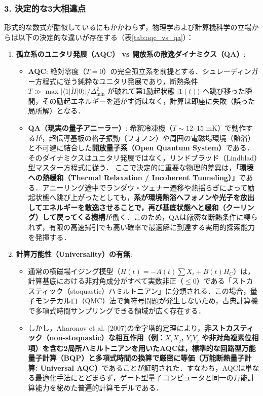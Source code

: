 \documentclass[11pt,a4paper,oneside,openany]{ltjsbook}
\theoremstyle{definition}
\theoremstyle{plain}
\theoremstyle{remark}
\newcommand{\ket}[1]{|#1\rangle}
\newcommand{\mel}[3]{\langle#1|#2|#3\rangle}
\begin{document}
\subsubsection*{3. 決定的な3大相違点}
形式的な数式が酷似しているにもかかわらず，物理学および計算機科学の立場からは以下の決定的な違いが存在する（表\ref{tab:aqc_vs_qa}）：

\begin{enumerate}
    \item \textbf{孤立系のユニタリ発展（AQC） vs 開放系の散逸ダイナミクス（QA）}:
    \begin{itemize}
        \item \textbf{AQC}: 絶対零度（$T=0$）の完全孤立系を前提とする．シュレーディンガー方程式に従う純粋なユニタリ発展であり，断熱条件 $T \gg \max |\mel{1}{\dot{H}}{0}| / \Delta_{\min}^2$ が破れて第1励起状態 $\ket{1(t)}$ へ跳び移った瞬間，その励起エネルギーを逃がす術はなく，計算は即座に失敗（誤った局所解）となる．
        \item \textbf{QA（現実の量子アニーラー）}: 希釈冷凍機（$T \sim 12\text{--}15\text{ mK}$）で動作するが，超伝導基板の格子振動（フォノン）や周囲の電磁場環境（熱浴）と不可避に結合した\textbf{開放量子系（Open Quantum System）}である．そのダイナミクスはユニタリ発展ではなく，リンドブラッド（Lindblad）型マスター方程式に従う．
        ここで決定的に重要な物理的差異は，\textbf{「環境への熱緩和（Thermal Relaxation / Incoherent Tunneling）」}である\cite{albash2018adiabatic}．アニーリング途中でランダウ・ツェナー遷移や熱揺らぎによって励起状態へ跳び上がったとしても，\textbf{系が環境熱浴へフォノンや光子を放出してエネルギーを散逸させることで，再び基底状態へと緩和（クーリング）して戻ってくる機構}が働く．このため，QAは厳密な断熱条件に縛られず，有限の高速掃引でも高い確率で最適解に到達する実用的探索能力を発揮する．
    \end{itemize}

    \item \textbf{計算万能性（Universality）の有無}:
    \begin{itemize}
        \item 通常の横磁場イジング模型（$H(t) = -A(t)\sum X_i + B(t)H_C$）は，計算基底における非対角成分がすべて実数非正（$\le 0$）である「ストカスティック（stoquastic）ハミルトニアン」に分類される．この場合，量子モンテカルロ（QMC）法で負符号問題が発生しないため，古典計算機で多項式時間サンプリングできる領域が広く存在する．
        \item しかし，Aharonov et al. (2007)\cite{aharonov2007adiabatic}の金字塔的定理により，\textbf{非ストカスティック（non-stoquastic）な相互作用（例：$X_i X_j$, $Y_i Y_j$ や非対角複素位相項）を含む2局所ハミルトニアンを用いたAQCは，標準的な回路型万能量子計算（BQP）と多項式時間の換算で厳密に等価（万能断熱量子計算: Universal AQC）}であることが証明された．すなわち，AQCは単なる最適化手法にとどまらず，ゲート型量子コンピュータと同一の万能計算能力を秘めた普遍的計算モデルである．
    \end{itemize}


\end{enumerate}
\end{document}
